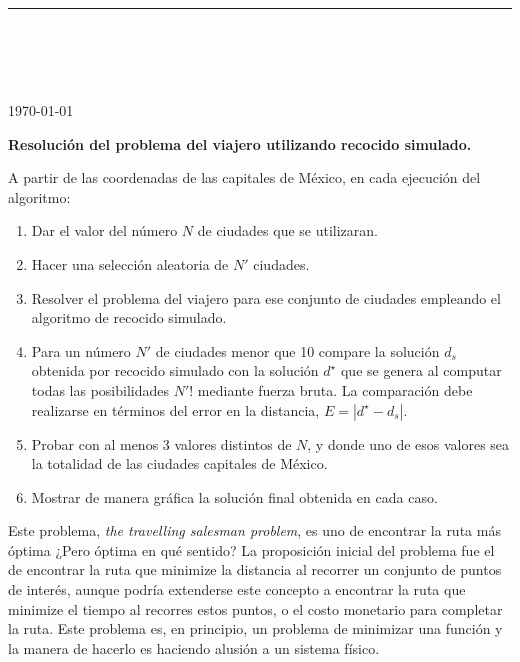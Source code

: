 



\thispagestyle{empty}

\begin{center}
\textsc{\theinstitution}\\[2mm]

\thedepartment

\rule{0.6\textwidth}{0.5pt}\\[2mm]

\thecourse \\[4mm]

{\Large \textbf{\thetitle}}\\[2mm]

\theauthor \\[2mm]

{\small \today}
\end{center}
\medskip

\vspace{1cm}

\textbf{Resolución del problema del viajero utilizando recocido simulado.}

A partir de las coordenadas de las capitales de México, en cada ejecución del algoritmo:
\begin{enumerate}
    \item Dar el valor del número $N$ de ciudades que se utilizaran.
    \item Hacer una selección aleatoria de $N'$ ciudades.
    \item Resolver el problema del viajero para ese conjunto de ciudades empleando el algoritmo de recocido simulado.
    \item Para un número $N'$ de ciudades menor que 10 compare la solución $d_s$ obtenida por recocido simulado con la solución $d^{\star}$ que se genera al computar todas las posibilidades $N'!$ mediante fuerza bruta. La comparación debe realizarse en términos del error en la distancia, $E = |d^{\star} - d_s|$.
    \item Probar con al menos 3 valores distintos de $N$, y donde uno de esos valores sea la totalidad de las ciudades capitales de México.
    \item Mostrar de manera gráfica la solución final obtenida en cada caso.
\end{enumerate}

Este problema, \textit{the travelling salesman problem}, es uno de encontrar la ruta más óptima ¿Pero óptima en qué sentido? La proposición inicial del problema fue el de encontrar la ruta que minimize la distancia al recorrer un conjunto de puntos de interés, aunque podría extenderse este concepto a encontrar la ruta que minimize el tiempo al recorres estos puntos, o el costo monetario para completar la ruta. Este problema es, en principio, un problema de minimizar una función y la manera de hacerlo es haciendo alusión a un sistema físico.


